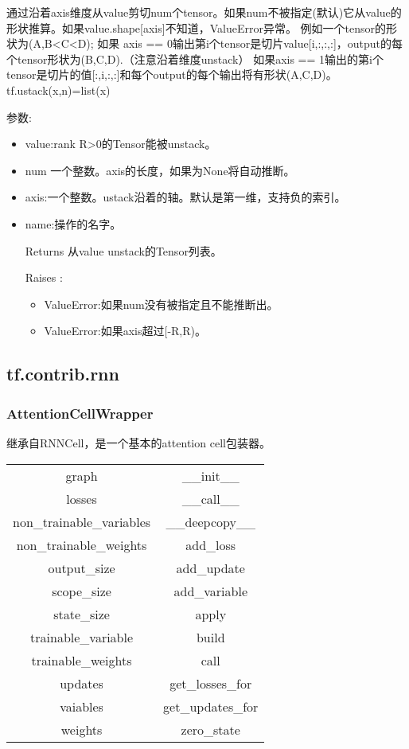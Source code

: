 通过沿着axis维度从value剪切num个tensor。如果num不被指定(默认)它从value的形状推算。如果value.shape[axis]不知道，ValueError异常。
例如一个tensor的形状为(A,B<C<D);
如果 axis == 0输出第i个tensor是切片value[i,:,:,:]，output的每个tensor形状为(B,C,D).（注意沿着维度unstack）
如果axis == 1输出的第i个tensor是切片的值[:,i,:,:]和每个output的每个输出将有形状(A,C,D)。
tf.ustack(x,n)=list(x)

参数:
\begin{itemize}
\item value:rank R>0的Tensor能被unstack。
\item num 一个整数。axis的长度，如果为None将自动推断。
\item axis:一个整数。ustack沿着的轴。默认是第一维，支持负的索引。
\item name:操作的名字。
\item[Returns] 从value unstack的Tensor列表。
\item[Raises]:
\begin{itemize}
\item ValueError:如果num没有被指定且不能推断出。
\item ValueError:如果axis超过[-R,R)。
\end{itemize}
\end{itemize}
\subsection{tf.contrib.rnn}
\subsubsection{AttentionCellWrapper}
继承自RNNCell，是一个基本的attention cell包装器。\newline
\begin{tabular}{|c|c|}
	graph&\_\_init\_\_\\
	losses&\_\_call\_\_\\
	non\_trainable\_variables&\_\_deepcopy\_\_\\
	non\_trainable\_weights&add\_loss\\
	output\_size&add\_update\\
	scope\_size&add\_variable\\
	state\_size&apply\\
	trainable\_variable&build\\
	trainable\_weights&call\\
	updates&get\_losses\_for\\
	vaiables&get\_updates\_for\\
	weights&zero\_state\\
\end{tabular}
